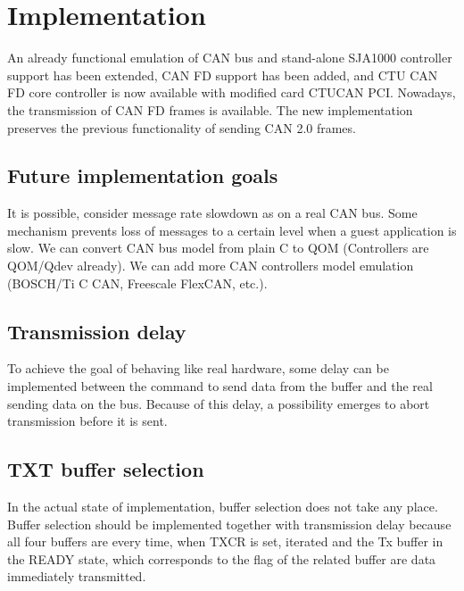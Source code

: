 \documentclass{ctuthesis}
\begin{document}
 \section{Implementation}
  An already functional emulation of CAN bus and stand-alone SJA1000 controller support has been extended, CAN FD support has been added, and  CTU CAN FD core controller is now available with modified card CTUCAN PCI. Nowadays, the transmission of CAN FD frames is available. The new implementation preserves the previous functionality of sending CAN 2.0 frames.

 \subsection{Future implementation goals}
  It is possible, consider message rate slowdown as on a real CAN bus. Some mechanism prevents loss of messages to a certain level when a guest application is slow. We can convert CAN bus model from plain C to QOM (Controllers are QOM/Qdev already). We can add more CAN controllers model emulation (BOSCH/Ti C CAN, Freescale FlexCAN, etc.).
 
 \subsection{Transmission delay}
 To achieve the goal of behaving like real hardware, some delay can  be implemented between the command to send data from the buffer and the real sending data on the bus. Because of this delay, a possibility emerges to abort transmission before it is sent.
 
 \subsection{TXT buffer selection}
  In the actual state of implementation, buffer selection does not take any place. Buffer selection should be implemented together with transmission delay because all four buffers are every time, when TXCR is set, iterated and the Tx buffer in the READY state, which corresponds to the flag of the related buffer are data immediately transmitted.
 
\end{document}
